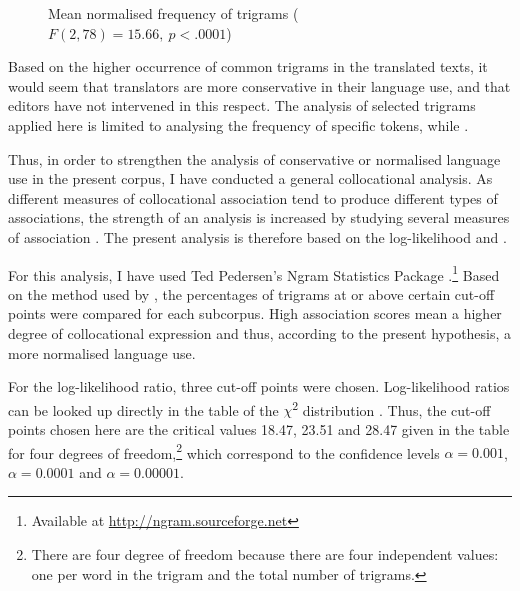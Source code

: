 \documentclass[output=paper]{LSP/langsci}
\begin{document}
\begin{figure}
  \caption{Mean normalised frequency of trigrams ($F(2,78)=15.66,~p<.0001$)}\label{bisiada:fig:trigr}
\end{figure}

Based on the higher occurrence of common trigrams in the translated texts, it would seem that translators are more conservative in their language use, and that editors have not intervened in this respect. The analysis of selected trigrams applied here is limited to analysing the frequency of specific tokens, while .

Thus, in order to strengthen the analysis of conservative or normalised language use in the present corpus, I have conducted a general collocational analysis. As different measures of collocational association tend to produce different types of associations, the strength of an analysis is increased by studying several measures of association \parencite[373]{barber03}. The present analysis is therefore based on the log-likelihood and  \parencite[for more information on these measures, see][ch. 5.3--5.4]{mansch99}.

\noindent For this analysis, I have used Ted Pedersen's Ngram Statistics Package \parencite{banped03}.\footnote{Available at \url{http://ngram.sourceforge.net}} Based on the method used by \textcite{barber03}, the percentages of trigrams at or above certain cut-off points were compared for each subcorpus. High association scores mean a higher degree of collocational expression and thus, according to the present hypothesis, a more normalised language use.

For the log-likelihood ratio, three cut-off points were chosen. Log-likelihood ratios can be looked up directly in the table of the $\chi$\textsuperscript{2} distribution \parencite[174]{mansch99}. Thus, the cut-off points chosen here are the critical values 18.47, 23.51 and 28.47 given in the table for four degrees of freedom,\footnote{There are four degree of freedom because there are four independent values: one per word in the trigram and the total number of trigrams.} which correspond to the confidence levels $\alpha=0.001$, $\alpha=0.0001$ and $\alpha=0.00001$.
\end{document}

